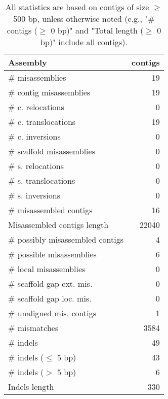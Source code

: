 \documentclass[12pt,a4paper]{article}
\begin{document}
\begin{table}[ht]
\begin{center}
\caption{All statistics are based on contigs of size $\geq$ 500 bp, unless otherwise noted (e.g., "\# contigs ($\geq$ 0 bp)" and "Total length ($\geq$ 0 bp)" include all contigs).}
\begin{tabular}{|l*{1}{|r}|}
\hline
Assembly & contigs \\ \hline
\# misassemblies & 19 \\ \hline
\hspace{2mm}\# contig misassemblies & 19 \\ \hline
\hspace{5mm}\# c. relocations & 0 \\ \hline
\hspace{5mm}\# c. translocations & 19 \\ \hline
\hspace{5mm}\# c. inversions & 0 \\ \hline
\hspace{2mm}\# scaffold misassemblies & 0 \\ \hline
\hspace{5mm}\# s. relocations & 0 \\ \hline
\hspace{5mm}\# s. translocations & 0 \\ \hline
\hspace{5mm}\# s. inversions & 0 \\ \hline
\# misassembled contigs & 16 \\ \hline
Misassembled contigs length & 22040 \\ \hline
\# possibly misassembled contigs & 4 \\ \hline
\hspace{5mm}\# possible misassemblies & 6 \\ \hline
\# local misassemblies & 0 \\ \hline
\# scaffold gap ext. mis. & 0 \\ \hline
\# scaffold gap loc. mis. & 0 \\ \hline
\# unaligned mis. contigs & 1 \\ \hline
\# mismatches & 3584 \\ \hline
\# indels & 49 \\ \hline
\hspace{5mm}\# indels ($\leq$ 5 bp) & 43 \\ \hline
\hspace{5mm}\# indels ($>$ 5 bp) & 6 \\ \hline
Indels length & 330 \\ \hline
\end{tabular}
\end{center}
\end{table}
\end{document}
